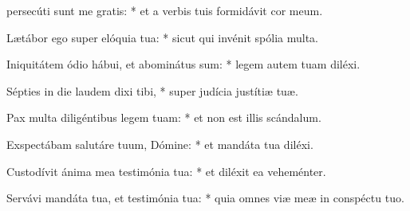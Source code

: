 \begin{psalmus}

 persecúti sunt me gratis: * et a verbis tuis formidávit cor meum.

Lætábor ego super elóquia tua: * sicut qui invénit spólia multa.

Iniquitátem ódio hábui, et abominátus sum: * legem autem tuam diléxi.

Sépties in die laudem dixi tibi, * super judícia justítiæ tuæ.

Pax multa diligéntibus legem tuam: * et non est illis scándalum.

Exspectábam salutáre tuum, Dómine: * et mandáta tua diléxi.

Custodívit ánima mea testimónia tua: * et diléxit ea veheménter.

Servávi mandáta tua, et testimónia tua: * quia omnes viæ meæ in conspéctu tuo.

\end{psalmus}
